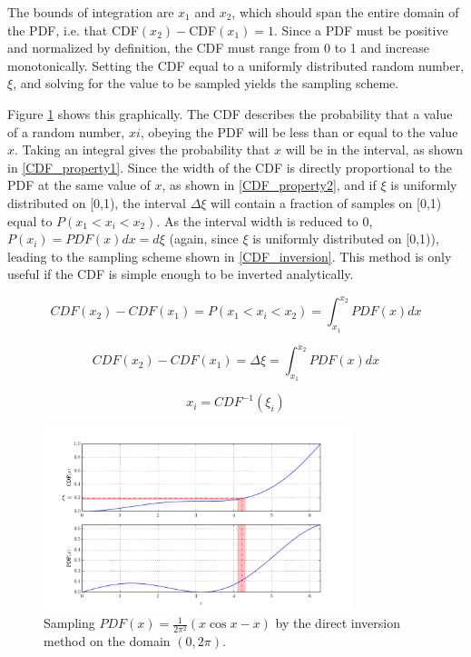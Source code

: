 The bounds of integration are $x_1$ and $x_2$, which should span the entire domain of the PDF, i.e. that CDF$(x_2) - $CDF$(x_1) = 1$. Since a PDF must be positive and normalized by definition, the CDF must range from 0 to 1 and increase monotonically.  Setting the CDF equal to a uniformly distributed random number, $\xi$, and solving for the value to be sampled yields the sampling scheme.  

Figure \ref{direct_samp} shows this graphically.  The CDF describes the probability that a value of a random number, $xi$, obeying the PDF will be less than or equal to the value $x$.  Taking an integral gives the probability that $x$ will be in the interval, as shown in \eqref{CDF_property1}.  Since the width of the CDF is directly proportional to the PDF at the same value of $x$, as shown in \eqref{CDF_property2}, and if $\xi$ is uniformly distributed on [0,1), the interval $\Delta \xi$ will contain a fraction of samples on [0,1) equal to $P( x_1 < x_i < x_2)$.  As the interval width is reduced to 0, $P(x_i)= PDF(x)dx = d\xi$ (again, since $\xi$ is uniformly distributed on [0,1)), leading to the sampling scheme shown in \eqref{CDF_inversion}.  This method is only useful if the CDF is simple enough to be inverted analytically.

\begin{equation}
\label{CDF_property1}
CDF(x_2) - CDF(x_1) = P( x_1 < x_i < x_2) = \int_{x_1}^{x_2} PDF(x) dx
\end{equation}

\begin{equation}
\label{CDF_property2}
CDF(x_2) - CDF(x_1) = \Delta \xi =  \int_{x_1}^{x_2} PDF(x) dx
\end{equation}

\begin{equation}
\label{CDF_inversion}
 x_i = CDF^{-1}(\xi_i)
\end{equation}

\begin{figure}[h!] 
  \centering
    \includegraphics[width=0.8\textwidth]{graphics/direct_samp.pdf}
     \caption{Sampling $PDF(x)=\frac{1}{2\pi^2}(x \cos x - x)$ by the direct inversion method on the domain $(0,2\pi)$. \label{direct_samp}}
\end{figure}

